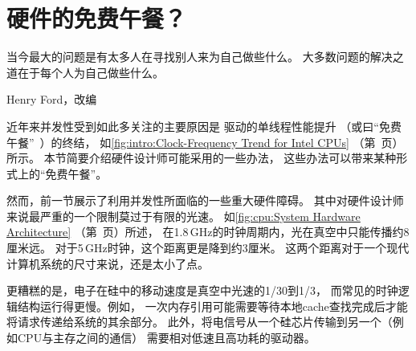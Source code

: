 
\section{硬件的免费午餐？}
\label{sec:cpu:Hardware Free Lunch?}
%
\epigraph{当今最大的问题是有太多人在寻找别人来为自己做些什么。
	  大多数问题的解决之道在于每个人为自己做些什么。}
	 {Henry Ford，改编}

近年来并发性受到如此多关注的主要原因是
驱动的单线程性能提升
（或曰``免费午餐''~\cite{HerbSutter2008EffectiveConcurrency}）的终结，
如\cref{fig:intro:Clock-Frequency Trend for Intel CPUs}
（第~页）所示。
本节简要介绍硬件设计师可能采用的一些办法，
这些办法可以带来某种形式上的``免费午餐''。

然而，前一节展示了利用并发性所面临的一些重大硬件障碍。
其中对硬件设计师来说最严重的一个限制莫过于有限的光速。
如\cref{fig:cpu:System Hardware Architecture}
（第~页）所述，
在1.8\,GHz的时钟周期内，光在真空中只能传播约8厘米远。
对于5\,GHz时钟，这个距离更是降到约3厘米。
这两个距离对于一个现代计算机系统的尺寸来说，还是太小了点。

更糟糕的是，电子在硅中的移动速度是真空中光速的1/30到1/3，
而常见的时钟逻辑结构运行得更慢。例如，
一次内存引用可能需要等待本地cache查找完成后才能将请求传递给系统的其余部分。
此外，将电信号从一个硅芯片传输到另一个（例如CPU与主存之间的通信）
需要相对低速且高功耗的驱动器。

